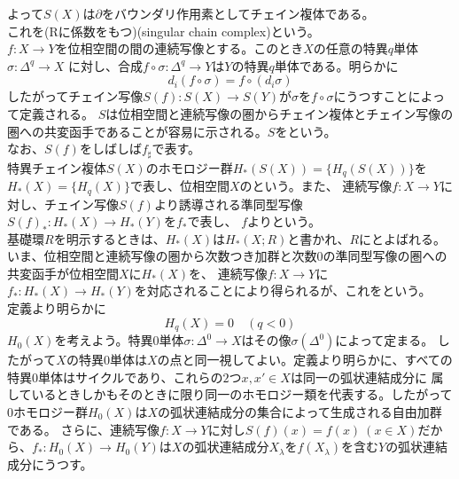 \documentclass[dvipdfmx,a4paper,11pt]{jsarticle}
\begin{document}
よって$S(X)$は$\partial$をバウンダリ作用素としてチェイン複体である。\\
これを(Rに係数をもつ)(singular chain complex)という。\\
$f:X\to Y$を位相空間の間の連続写像とする。このとき$X$の任意の特異$q$単体$\sigma : \Delta^q \to X$
に対し、合成$f\circ \sigma : \Delta^q \to Y$は$Y$の特異$q$単体である。明らかに
\begin{equation*}
  d_{i}(f\circ \sigma)=f\circ (d_{i}\sigma)
\end{equation*}
したがってチェイン写像$S(f):S(X)\to S(Y)$が$\sigma$を$f\circ \sigma$にうつすことによって定義される。
$S$は位相空間と連続写像の圏からチェイン複体とチェイン写像の圏への共変函手であることが容易に示される。$S$をという。\\
なお、$S(f)$をしばしば$f_{\sharp}$で表す。\\
特異チェイン複体$S(X)$のホモロジー群$H_{*}(S(X))=\{H_{q}(S(X))\}$を$H_{*}(X)=\{H_{q}(X)\}$で表し、位相空間$X$のという。また、
連続写像$f:X\to Y$に対し、チェイン写像$S(f)$より誘導される準同型写像$S(f)_{*}:H_{*}(X)\to H_{*}(Y)$を$f_{*}$で表し、
$f$よりという。\\
基礎環$R$を明示するときは、$H_{*}(X)$は$H_{*}(X;R)$と書かれ、$R$にとよばれる。\\
いま、位相空間と連続写像の圏から次数つき加群と次数$0$の準同型写像の圏への共変函手が位相空間$X$に$H_{*}(X)$を、
連続写像$f:X\to Y$に$f_{*}:H_{*}(X)\to H_{*}(Y)$を対応されることにより得られるが、これをという。\\
定義より明らかに
\begin{equation*}
  H_{q}(X)=0\quad (q<0)
\end{equation*}
$H_{0}(X)$を考えよう。特異$0$単体$\sigma : \Delta^{0}\to X$はその像$\sigma(\Delta^{0})$によって定まる。
したがって$X$の特異$0$単体は$X$の点と同一視してよい。定義より明らかに、すべての特異$0$単体はサイクルであり、これらの$2$つ$x,x'\in X$は同一の弧状連結成分に
属しているときしかもそのときに限り同一のホモロジー類を代表する。したがって$0$ホモロジー群$H_{0}(X)$は$X$の弧状連結成分の集合によって生成される自由加群である。
さらに、連続写像$f:X\to Y$に対し$S(f)(x)=f(x)\ (x\in X)$だから、$f_{*}:H_{0}(X)\to H_{0}(Y)$は$X$の弧状連結成分$X_{\lambda}$を$f(X_{\lambda})$を含む$Y$の弧状連結成分にうつす。\\
\end{document}
